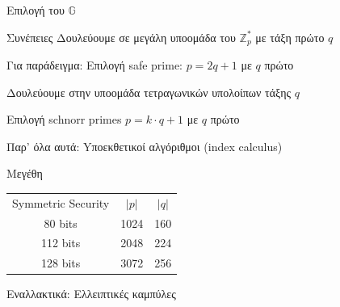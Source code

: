 \documentclass[handout]{beamer}
\begin{document}
\begin{frame}{Επιλογή του $\mathbb{G}$}
\begin{small}
\begin{block}{Συνέπειες}
Δουλεύουμε σε μεγάλη υποομάδα του $\mathbb{Z}_p^*$ με τάξη πρώτο $q$
\end{block}
\pause
\begin{block}{Για παράδειγμα:}
Επιλογή safe prime: $p = 2q+1$ με $q$ πρώτο 

Δουλεύουμε στην υποομάδα τετραγωνικών υπολοίπων τάξης $q$

Επιλογή schnorr primes $p = k \cdot q+1$ με $q$ πρώτο

\alert{Παρ' όλα αυτά}: Yποεκθετικοί αλγόριθμοι (index calculus)
\end{block}
\pause
\begin{block}{Μεγέθη}
\begin{tabular}{ccc}
Symmetric Security & $|p|$ & $|q|$ \\
80 bits &  1024 & 160 \\
112 bits & 2048 & 224 \\
128 bits &  3072 & 256 \\
\end{tabular}
\end{block}
\pause
Εναλλακτικά: Ελλειπτικές καμπύλες
\end{small}
\end{frame} 
\end{document}
